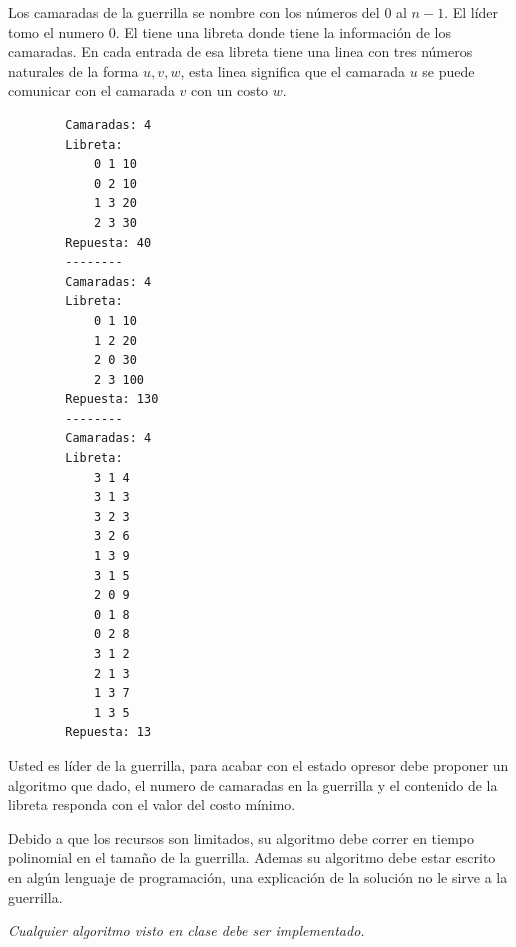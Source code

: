 \documentclass[12pt, a4paper]{exam}
\begin{document}
\begin{questions}
    Los camaradas de la guerrilla se nombre con los números del 0 al $n-1$. El líder tomo
    el numero $0$. El tiene una libreta donde tiene la información de los camaradas. En cada 
    entrada de esa libreta tiene una linea con tres números naturales de la forma $u,v,w$,
    esta linea significa que el camarada $u$ se puede comunicar con el camarada $v$ con un
    costo $w$.

    \begin{verbatim}
        Camaradas: 4
        Libreta:
            0 1 10
            0 2 10
            1 3 20
            2 3 30
        Repuesta: 40
        --------
        Camaradas: 4
        Libreta:
            0 1 10
            1 2 20
            2 0 30
            2 3 100
        Repuesta: 130
        --------
        Camaradas: 4
        Libreta:
            3 1 4
            3 1 3
            3 2 3
            3 2 6
            1 3 9
            3 1 5
            2 0 9
            0 1 8
            0 2 8
            3 1 2
            2 1 3
            1 3 7
            1 3 5
        Repuesta: 13
    \end{verbatim}

    Usted es líder de la guerrilla, para acabar con el estado opresor debe proponer un algoritmo 
    que dado, el numero de camaradas en la guerrilla y el contenido de la libreta responda
    con el valor del costo mínimo. 

    Debido a que los recursos son limitados, su algoritmo debe correr en tiempo polinomial en el tamaño
    de la guerrilla. Ademas su algoritmo debe estar escrito en algún lenguaje de programación, una 
    explicación de la solución no le sirve a la guerrilla. 

    \textit{Cualquier algoritmo visto en clase debe ser implementado.}

    


 
	

\end{questions}
\end{document}
